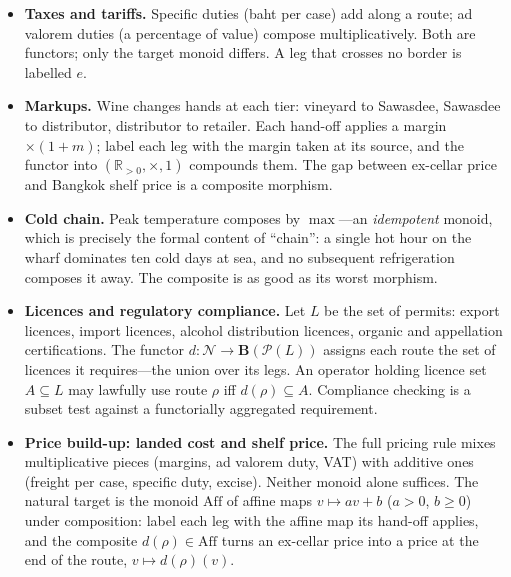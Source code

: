 \documentclass[11pt,a4paper]{article}
\newcommand{\N}{\mathcal{N}}
\theoremstyle{plain}
\theoremstyle{definition}
\theoremstyle{remark}
\begin{document}
\begin{itemize}[nosep]
\item \textbf{Taxes and tariffs.} Specific duties (baht per case)
  add along a route; ad valorem duties (a percentage of value)
  compose multiplicatively. Both are functors; only the target monoid
  differs. A leg that crosses no border is labelled $e$.
\item \textbf{Markups.} Wine changes hands at each tier: vineyard to
  Sawasdee, Sawasdee to distributor, distributor to retailer. Each
  hand-off applies a margin $\times(1+m)$; label each leg with the
  margin taken at its source, and the functor into
  $(\mathbb{R}_{>0}, \times, 1)$ compounds them. The gap between
  ex-cellar price and Bangkok shelf price is a composite morphism.
\item \textbf{Cold chain.} Peak temperature composes by $\max$---an
  \emph{idempotent} monoid, which is precisely the formal content of
  ``chain'': a single hot hour on the wharf dominates ten cold days at
  sea, and no subsequent refrigeration composes it away. The composite
  is as good as its worst morphism.
\item \textbf{Licences and regulatory compliance.} Let $L$ be the set
  of permits: export licences, import licences, alcohol distribution
  licences, organic and appellation certifications. The functor
  $d : \N \to \mathbf{B}(\mathcal{P}(L))$ assigns each route the set of
  licences it requires---the union over its legs. An operator holding
  licence set $A \subseteq L$ may lawfully use route $\rho$ iff
  $d(\rho) \subseteq A$. Compliance checking is a subset test against
  a functorially aggregated requirement.
\item \textbf{Price build-up: landed cost and shelf price.} The full
  pricing rule mixes multiplicative pieces (margins, ad valorem duty,
  VAT) with additive ones (freight per case, specific duty, excise).
  Neither monoid alone suffices. The natural target is the monoid
  $\mathrm{Aff}$ of affine maps $v \mapsto av + b$ ($a > 0$, $b \geq 0$)
  under composition: label each leg with the affine map its hand-off
  applies, and the composite $d(\rho) \in \mathrm{Aff}$ turns an
  ex-cellar price into a price at the end of the route,
  $v \mapsto d(\rho)(v)$.
\end{itemize}
\end{document}

